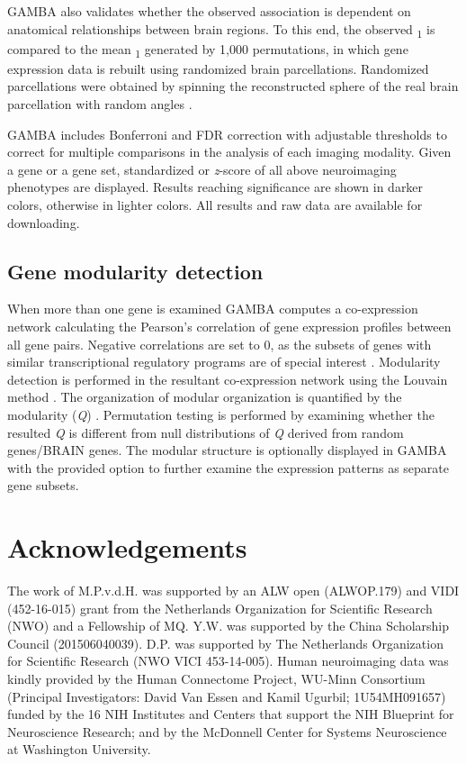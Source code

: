 \begin{refsection}
GAMBA also validates whether the observed association is dependent on anatomical relationships between brain regions. To this end, the observed \textbeta\textsubscript{1} is compared to the mean \textbeta\textsubscript{1} generated by 1,000 permutations, in which gene expression data is rebuilt using randomized brain parcellations. Randomized parcellations were obtained by spinning the reconstructed sphere of the real brain parcellation with random angles \citep{AlexanderBloch2018OnTF}.

GAMBA includes Bonferroni and FDR correction with adjustable thresholds to correct for multiple comparisons in the analysis of each imaging modality. Given a gene or a gene set, standardized \textbeta or \textit{z}-score of all above neuroimaging phenotypes are displayed. Results reaching significance are shown in darker colors, otherwise in lighter colors. All results and raw data are available for downloading.

\subsection*{Gene modularity detection}

When more than one gene is examined GAMBA computes a co-expression network calculating the Pearson's correlation of gene expression profiles between all gene pairs. Negative correlations are set to 0, as the subsets of genes with similar transcriptional regulatory programs are of special interest \citep{Stuart2003AGN}. Modularity detection is performed in the resultant co-expression network using the Louvain method \citep{Blondel2008FastUO}. The organization of modular organization is quantified by the modularity (\textit{Q}) \citep{newman2006finding}. Permutation testing is performed by examining whether the resulted \textit{Q} is different from null distributions of \textit{Q} derived from random genes/BRAIN genes. The modular structure is optionally displayed in GAMBA with the provided option to further examine the expression patterns as separate gene subsets.

\section*{Acknowledgements}
The work of M.P.v.d.H. was supported by an ALW open (ALWOP.179) and VIDI (452-16-015) grant from the Netherlands Organization for Scientific Research (NWO) and a Fellowship of MQ. Y.W. was supported by the China Scholarship Council (201506040039). D.P. was supported by The Netherlands Organization for Scientific Research (NWO VICI 453-14-005). Human neuroimaging data was kindly provided by the Human Connectome Project, WU-Minn Consortium (Principal Investigators: David Van Essen and Kamil Ugurbil; 1U54MH091657) funded by the 16 NIH Institutes and Centers that support the NIH Blueprint for Neuroscience Research; and by the McDonnell Center for Systems Neuroscience at Washington University.


\printbibliography[heading=subbibliography]

\end{refsection}

